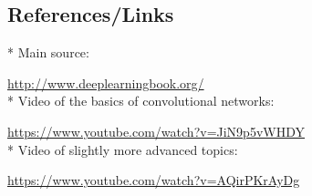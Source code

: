 \documentclass[]{article}
\begin{document}




\subsection{References/Links}
* Main source:

\url{http://www.deeplearningbook.org/}\\
* Video of the basics of convolutional networks:

\url{https://www.youtube.com/watch?v=JiN9p5vWHDY}\\
* Video of slightly more advanced topics:

\url{https://www.youtube.com/watch?v=AQirPKrAyDg}
\end{document}
